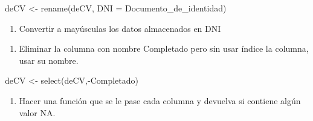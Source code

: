 \documentclass[
]{book}
\newenvironment{Shaded}{\begin{snugshade}}{\end{snugshade}}
\newcommand{\AttributeTok}[1]{\textcolor[rgb]{0.77,0.63,0.00}{#1}}
\newcommand{\ControlFlowTok}[1]{\textcolor[rgb]{0.13,0.29,0.53}{\textbf{#1}}}
\newcommand{\FunctionTok}[1]{\textcolor[rgb]{0.00,0.00,0.00}{#1}}
\newcommand{\NormalTok}[1]{#1}
\newcommand{\OtherTok}[1]{\textcolor[rgb]{0.56,0.35,0.01}{#1}}
\newcommand{\SpecialCharTok}[1]{\textcolor[rgb]{0.00,0.00,0.00}{#1}}
\providecommand{\tightlist}{%
  \setlength{\itemsep}{0pt}\setlength{\parskip}{0pt}}
\begin{document}
\begin{Shaded}
\begin{Highlighting}[]
\NormalTok{deCV }\OtherTok{\textless{}{-}} \FunctionTok{rename}\NormalTok{(deCV, }\AttributeTok{DNI =}\NormalTok{ Documento\_de\_identidad)}
\end{Highlighting}
\end{Shaded}

\begin{enumerate}
\def\labelenumi{\arabic{enumi}.}
\setcounter{enumi}{3}
\tightlist
\item
  Convertir a mayúsculas los datos almacenados en DNI
\end{enumerate}

\begin{Shaded}
\end{Shaded}

\begin{enumerate}
\def\labelenumi{\arabic{enumi}.}
\setcounter{enumi}{4}
\tightlist
\item
  Eliminar la columna con nombre Completado pero sin usar índice la columna, usar su nombre.
\end{enumerate}

\begin{Shaded}
\begin{Highlighting}[]
\NormalTok{deCV }\OtherTok{\textless{}{-}} \FunctionTok{select}\NormalTok{(deCV,}\SpecialCharTok{{-}}\NormalTok{Completado)}
\end{Highlighting}
\end{Shaded}

\begin{enumerate}
\def\labelenumi{\arabic{enumi}.}
\setcounter{enumi}{5}
\tightlist
\item
  Hacer una función que se le pase cada columna y devuelva si contiene algún valor NA.
\end{enumerate}

\begin{Shaded}
\end{Shaded}
\end{document}
